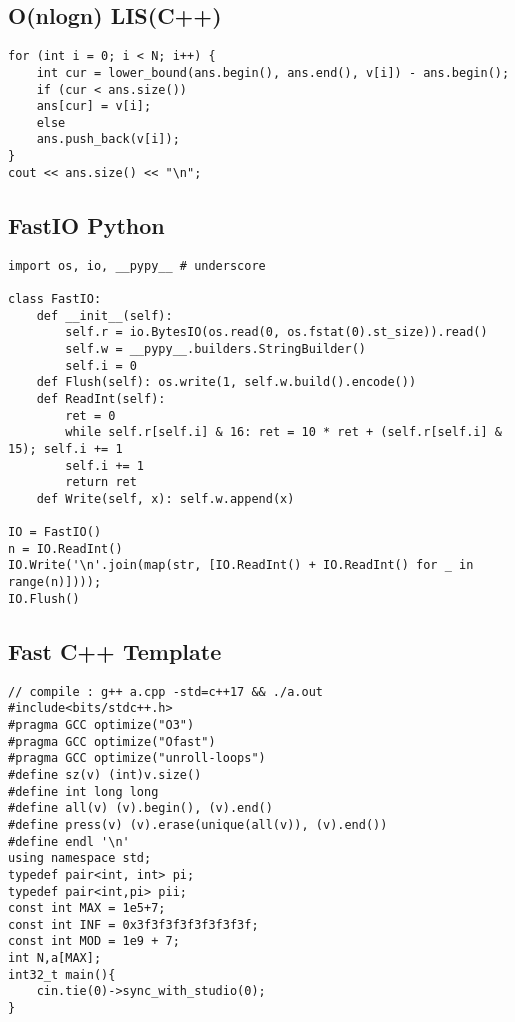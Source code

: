 \documentclass[landscape, 8pt, a4paper, oneside, twocolumn]{extarticle}
\begin{document}
\subsection{O(nlogn) LIS(C++)}
\begin{verbatim}
for (int i = 0; i < N; i++) {
	int cur = lower_bound(ans.begin(), ans.end(), v[i]) - ans.begin();
	if (cur < ans.size())
	ans[cur] = v[i];
	else
	ans.push_back(v[i]);
}
cout << ans.size() << "\n";
\end{verbatim}
\subsection{FastIO Python}
\begin{verbatim}
import os, io, __pypy__ # underscore

class FastIO:
	def __init__(self):
		self.r = io.BytesIO(os.read(0, os.fstat(0).st_size)).read()
		self.w = __pypy__.builders.StringBuilder()
		self.i = 0
	def Flush(self): os.write(1, self.w.build().encode())
	def ReadInt(self):
		ret = 0
		while self.r[self.i] & 16: ret = 10 * ret + (self.r[self.i] & 15); self.i += 1
		self.i += 1
		return ret
	def Write(self, x): self.w.append(x)

IO = FastIO()
n = IO.ReadInt()
IO.Write('\n'.join(map(str, [IO.ReadInt() + IO.ReadInt() for _ in range(n)])));
IO.Flush()
\end{verbatim}
\subsection{Fast C++ Template}
\begin{verbatim}
// compile : g++ a.cpp -std=c++17 && ./a.out
#include<bits/stdc++.h>
#pragma GCC optimize("O3")
#pragma GCC optimize("Ofast")
#pragma GCC optimize("unroll-loops")
#define sz(v) (int)v.size()
#define int long long
#define all(v) (v).begin(), (v).end()
#define press(v) (v).erase(unique(all(v)), (v).end())
#define endl '\n'
using namespace std;
typedef pair<int, int> pi;
typedef pair<int,pi> pii;
const int MAX = 1e5+7;
const int INF = 0x3f3f3f3f3f3f3f3f;
const int MOD = 1e9 + 7;
int N,a[MAX];
int32_t main(){
	cin.tie(0)->sync_with_studio(0);
}
\end{verbatim}
\end{document}
